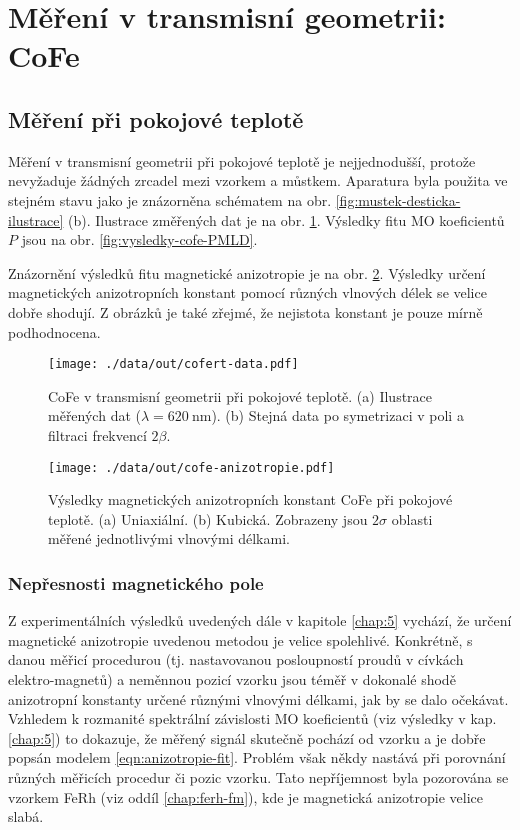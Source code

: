 \section{Měření v transmisní geometrii: CoFe}
\label{chap:vysledky-cofe}

\subsection{Měření při pokojové teplotě}
\label{chap:vysledky-cofe-roomt}

Měření v transmisní geometrii při pokojové teplotě je nejjednodušší, protože nevyžaduje žádných zrcadel mezi vzorkem a můstkem.
Aparatura byla použita ve stejném stavu jako je znázorněna schématem na obr. \ref{fig:mustek-desticka-ilustrace} (b).
Ilustrace změřených dat je na obr. \ref{fig:vysledky-cofe-schema-data}.
Výsledky fitu MO koeficientů $P$ jsou na obr. \ref{fig:vysledky-cofe-PMLD}.

Znázornění výsledků fitu magnetické anizotropie je na obr. \ref{fig:vysledky-cofe-roomt-anizotropie}.
Výsledky určení magnetických anizotropních konstant pomocí různých vlnových délek se velice dobře shodují. 
Z obrázků je také zřejmé, že nejistota konstant je pouze mírně podhodnocena.

\begin{figure}[htbp]
    \centering
    \texttt{[image: ./data/out/cofert-data.pdf]}
    \caption{CoFe v transmisní geometrii při pokojové teplotě. (a) Ilustrace měřených dat ($\lambda=\SI{620}{\nano\meter}$). (b) Stejná data po symetrizaci v poli a filtraci frekvencí $2\beta$.}
    \label{fig:vysledky-cofe-schema-data}
\end{figure}

\begin{figure}[htbp]
    \centering
    \texttt{[image: ./data/out/cofe-anizotropie.pdf]}
    \caption{Výsledky magnetických anizotropních konstant CoFe při pokojové teplotě. (a) Uniaxiální. (b) Kubická. Zobrazeny jsou $2\sigma$ oblasti měřené jednotlivými vlnovými délkami.}
    \label{fig:vysledky-cofe-roomt-anizotropie}
\end{figure}

\subsubsection{Nepřesnosti magnetického pole}

Z experimentálních výsledků uvedených dále v kapitole \ref{chap:5} vychází, že určení magnetické anizotropie uvedenou metodou je velice spolehlivé.
Konkrétně, s danou měřicí procedurou (tj. nastavovanou posloupností proudů v cívkách elektro-magnetů) a neměnnou pozicí vzorku jsou téměř v dokonalé shodě anizotropní konstanty určené různými vlnovými délkami, jak by se dalo očekávat.
Vzhledem k rozmanité spektrální závislosti MO koeficientů (viz výsledky v kap. \ref{chap:5}) to dokazuje, že měřený signál skutečně pochází od vzorku a je dobře popsán modelem \eqref{eqn:anizotropie-fit}.
Problém však někdy nastává při porovnání různých měřicích procedur či pozic vzorku.
Tato nepříjemnost byla pozorována se vzorkem FeRh (viz oddíl \ref{chap:ferh-fm}), kde je magnetická anizotropie velice slabá.

